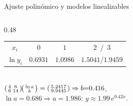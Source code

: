 \documentclass[aspectratio=169,10pt]{beamer}
\begin{document}
\begin{frame}{Ajuste polinómico y modelos linealizables}
\begin{columns}[T]
\begin{column}{0.48\textwidth}
\begin{cardnota}[\faTable]
{\renewcommand{\arraystretch}{1.05}\setlength{\tabcolsep}{6pt}
\begin{tabular}{c|ccc}
$x_i$&$0$&$1$&$2$\ /\ $3$\\
$\ln y_i$&$0.6931$&$1.0986$&$1.5041$/$1.9459$\\
\end{tabular}\\[0.8mm]
$\begin{psmallmatrix}4&6\\ 6&14\end{psmallmatrix}\!\begin{psmallmatrix}\ln a\\ b\end{psmallmatrix}=\begin{psmallmatrix}5.2417\\ 9.9445\end{psmallmatrix}\Rightarrow b{=}0.416$,\\[0.4mm]
$\ln a{=}0.686\Rightarrow a{=}1.986$: $y\approx1.99\,e^{0.42x}$.}
\end{cardnota}
\end{column}
\end{columns}
\end{frame}
\end{document}
